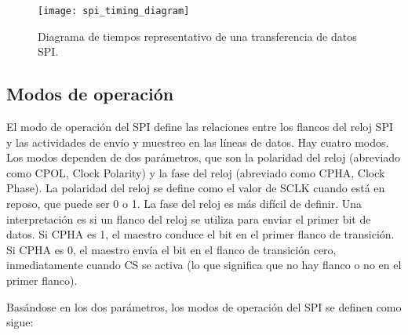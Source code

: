     \begin{figure}[hbtp]
      \centering
      \texttt{[image: spi\_timing\_diagram]}
      \caption{Diagrama de tiempos representativo de una transferencia de datos SPI.}
      \label{fig:spi_timing_diagram}
    \end{figure}

    \subsection{Modos de operación}

    El modo de operación del SPI define las relaciones entre los flancos del reloj SPI y las actividades de envío y muestreo en las líneas de datos. Hay cuatro modos. Los modos dependen de dos parámetros, que son la polaridad del reloj (abreviado como CPOL, Clock Polarity) y la fase del reloj (abreviado como CPHA, Clock Phase). La polaridad del reloj se define como el valor de SCLK cuando está en reposo, que puede ser 0 o 1. La fase del reloj es más difícil de definir. Una interpretación es si un flanco del reloj se utiliza para enviar el primer bit de datos. Si CPHA es 1, el maestro conduce el bit en el primer flanco de transición. Si CPHA es 0, el maestro envía el bit en el flanco de transición cero, inmediatamente cuando CS se activa (lo que significa que no hay flanco o no en el primer flanco).

    Basándose en los dos parámetros, los modos de operación del SPI se definen como sigue:

    \begin{table}[h!]
      \caption{Modos de operación del SPI.}
      \begin{center}
      \label{tab:spi_modes}
      \end{center}
    \end{table}

